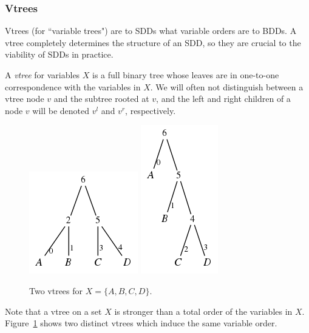 \documentclass[11pt]{article}
\newenvironment{definition}[1][Definition]{\begin{trivlist}
\item[\hskip \labelsep {\bfseries #1}]}{\end{trivlist}}
\begin{document}
\subsubsection*{Vtrees}

Vtrees (for ``variable trees") are to SDDs what variable orders are to BDDs. A vtree completely determines the structure of an SDD, so they are crucial to the viability of SDDs in practice.

\begin{definition}
A \textit{vtree} for variables $X$ is a full binary tree whose leaves are in one-to-one correspondence with the  variables in $X$. We will often not distinguish between a vtree node $v$ and the subtree rooted at $v$, and the left and right children of a node $v$ will be denoted $v^l$ and $v^r$, respectively.
\end{definition}

\begin{figure}
\centering
\includegraphics[scale=0.5]{balancedABCD.png}
\qquad
\includegraphics[scale=0.5]{rightlinearABCD.png}


\caption{Two vtrees for $X = \{A, B, C, D\}.$}
\label{fig:vtree_examples} 

\end{figure}
Note that a vtree on a set $X$ is stronger than a total order of the variables in $X$. Figure~\ref{fig:vtree_examples} shows two distinct vtrees which induce the same variable order. 
\end{document}
